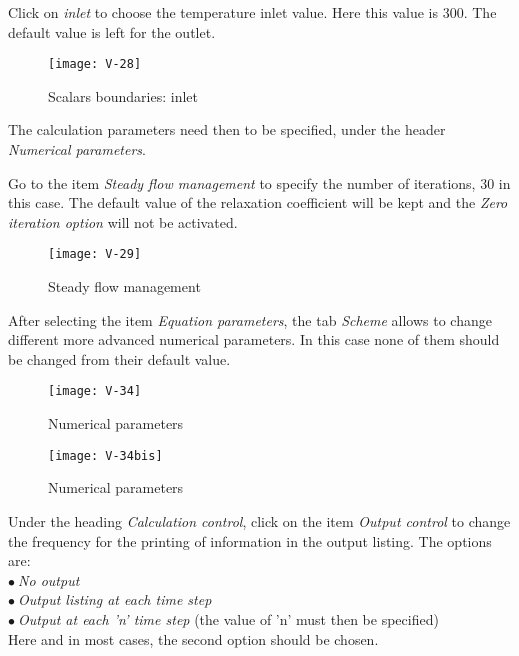 \clearpage
Click on {\itshape inlet} to choose the temperature inlet
value. Here this value is 300\degresC.
The default value is left for the outlet.

\begin{figure}[ht]
\begin{center}
\texttt{[image: V-28]}
\caption{Scalars boundaries: inlet}
\label{fig31_e1}
\end{center}
\end{figure}


\clearpage
The calculation parameters need then to be specified, under the header {\itshape
Numerical parameters}.

Go to the item {\itshape Steady flow management} to specify the number of iterations,
30 in this case. The default value of the relaxation
coefficient will be kept and  the {\itshape Zero iteration option} 
will not be activated.

\begin{figure}[ht]
\begin{center}
\texttt{[image: V-29]}
\caption{Steady flow management}
\label{fig32_e1}
\end{center}
\end{figure}


\clearpage
After selecting the item {\itshape Equation parameters}, the tab {\itshape Scheme} allows to change different more
advanced numerical parameters. In this case none of them should be changed from
their default value.

\begin{figure}[!h]
\begin{center}
\texttt{[image: V-34]}
\caption{Numerical parameters}
\label{fig3738_e1}
\end{center}
\end{figure}

\begin{figure}[!h]
\begin{center}
\texttt{[image: V-34bis]}
\caption{Numerical parameters}
\label{fig3738bis_e1}
\end{center}
\end{figure}

\clearpage
Under the heading {\itshape Calculation control}, click on the item {\itshape Output control} to change the frequency for the
printing of information in the output listing.
The options are:\\
\hspace*{1cm}$\bullet\ ${\itshape No output}\\
\hspace*{1cm}$\bullet\ ${\itshape Output listing at each time step}\\
\hspace*{1cm}$\bullet\ ${\itshape Output at each 'n' time step} (the value of
'n' must then be specified)\\
Here and in most cases, the second option should be chosen.

